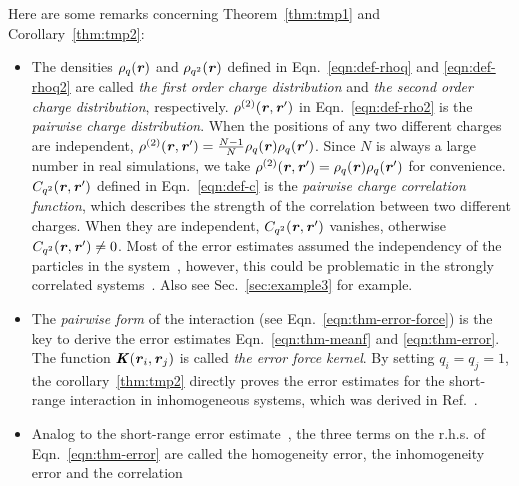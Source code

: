 \documentclass[aps,pre,preprint]{revtex4}
\renewcommand{\v}[1]{\textbf{\textit{#1}}}
\begin{document}
Here are some remarks concerning Theorem~\ref{thm:tmp1} and Corollary~\ref{thm:tmp2}:
\begin{itemize}
\item The densities $\rho_q(\v r)$ and $\rho_{q^2}(\v r)$ defined in
  Eqn.~\eqref{eqn:def-rhoq} and \eqref{eqn:def-rhoq2} are called \emph{the
    first order charge distribution} and \emph{the
    second order charge distribution},
  respectively.
  $\rho^{(2)}(\v r, \v r')$ in Eqn.~\eqref{eqn:def-rho2}
  is the \emph{pairwise charge distribution}.
  When the positions of any two different charges are independent,
  $\rho^{(2)}(\v r, \v r') = \frac{N-1}{N}\rho_q(\v r)\rho_q(\v r')$.
  Since $N$ is always a large number in real simulations, we take
  $\rho^{(2)}(\v r, \v r') = \rho_q(\v r)\rho_q(\v r')$ for convenience.
  $C_{q^2}(\v r, \v r')$ defined in
  Eqn.~\eqref{eqn:def-c} is the \emph{pairwise charge correlation function},
  which describes the strength of the correlation between  two
  different charges. When they are independent, $C_{q^2}(\v r, \v r')$
  vanishes, otherwise $C_{q^2}(\v r, \v r') \neq 0$.
  Most of the error estimates assumed the independency of the
  particles in the system~\cite{kolafa1992cutoff, hummer1995numerical, deserno1998mue2, petersen1995accuracy, wang2010optimizing, neelov2010interlaced, ballenegger2012convert, wang2012},
  however, this could be problematic in the strongly correlated
  systems~\cite{deserno1998mue2, wang2010optimizing}.
  Also see Sec.~\ref{sec:example3} for example.
\item
  The \emph{pairwise form}
  of the interaction (see Eqn.~\eqref{eqn:thm-error-force}) is the key to derive
  the error estimates Eqn.~\eqref{eqn:thm-meanf} and \eqref{eqn:thm-error}.
  The function $\v K(\v r_i, \v r_j)$ is called \emph{the error force
    kernel}.
  By setting $q_i = q_j = 1$, the corollary~\ref{thm:tmp2} directly proves
  the error estimates for the short-range interaction
  in inhomogeneous systems, which was derived in Ref.~\cite{wang2012}. 
\item Analog to the short-range error estimate~\cite{wang2012}, the
  three terms on the r.h.s. of Eqn.~\eqref{eqn:thm-error} are called the
  homogeneity error, the inhomogeneity error and the correlation

\end{itemize}
\end{document}
